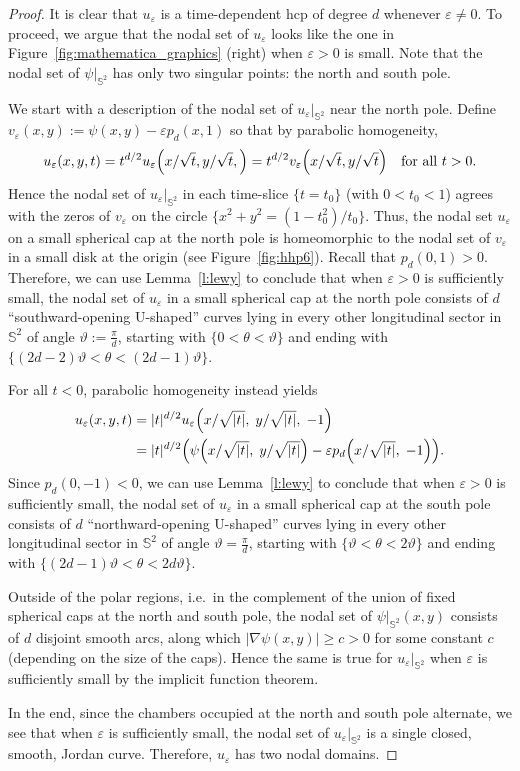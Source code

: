 \documentclass[10pt]{amsart}
\theoremstyle{definition}\newtheorem{defi}[theo]{Definition}\newtheorem{rema}[theo]{Remark}\newtheorem{exam}[theo]{Example}\newtheorem{exem}[theo]{Example}\newtheorem{nota}[theo]{Notation}
\newcommand{\sphere}{\mathbb{S}}
\renewcommand{\epsilon}{\varepsilon}
\let\originalleft\left
\let\originalright\right
\renewcommand{\left}{\mathopen{}\mathclose\bgroup\originalleft}
\renewcommand{\right}{\aftergroup\egroup\originalright}
\begin{document}
\begin{proof}
It is clear that $u_\epsilon$ is a time-dependent hcp of degree $d$ whenever $\epsilon\neq 0$. To proceed, we argue that the nodal set of $u_\epsilon$ looks like the one in Figure~\ref{fig:mathematica_graphics} (right) when $\epsilon>0$ is small. Note that the nodal set of $\psi|_{\sphere^2}$ has only two singular points: the north and south pole.

We start with a description of the nodal set of $u_\epsilon|_{\sphere^2}$ near the north pole. Define $v_\epsilon (x,y):=\psi(x,y)-\epsilon p_d(x,1)$ so that by parabolic homogeneity,
\[
u_\epsilon(x,y,t)= t^{d/2} u_\epsilon\left(x/\sqrt{t},y/\sqrt{t},\right)=t^{d/2}v_\epsilon\left(x/\sqrt{t},y/\sqrt{t}\right)\quad\text{for all $t>0$}.
\]
Hence the nodal set of $u_{\epsilon}|_{\sphere^2}$ in each time-slice $\{t=t_0\}$ (with $0<t_0<1$) agrees with the zeros of $v_{\epsilon}$ on the circle $\{x^2 + y^2 = (1-t_0^2)/t_0 \}$. Thus, the nodal set $u_\epsilon$ on a small spherical cap at the north pole is homeomorphic to the nodal set of $v_\epsilon$ in a small disk at the origin (see Figure~\ref{fig:hhp6}). Recall that $p_d(0,1)>0$. Therefore, we can use Lemma~\ref{l:lewy} to conclude that when $\epsilon>0$ is sufficiently small, the nodal set of $u_\epsilon$ in a small spherical cap at the north pole consists of $d$ ``southward-opening U-shaped'' curves lying in every other longitudinal sector in $\sphere^2$ of angle $\vartheta:=\frac{\pi}{d}$, starting with $\{0 < \theta < \vartheta\}$ and ending with $\{(2d-2)\vartheta<\theta<(2d-1)\vartheta\}$.

For all $t<0$, parabolic homogeneity instead yields
\begin{align*}
u_\epsilon(x,y,t) &=|t|^{d/2}u_\epsilon\left(x/\sqrt{|t|},\;y/\sqrt{|t|},\;-1\right)\\
&=|t|^{d/2}\left(\psi\left(x/\sqrt{|t|},\;y/\sqrt{|t|}\right)-\epsilon p_d\left(x/\sqrt{|t|},\;-1\right)\right).
\end{align*}
Since $p_d(0,-1)<0$, we can use Lemma~\ref{l:lewy} to conclude that when $\epsilon>0$ is sufficiently small, the nodal set of $u_\epsilon$ in a small spherical cap at the south pole consists of $d$ ``northward-opening U-shaped'' curves lying in every other longitudinal sector in $\sphere^2$ of angle $\vartheta=\frac{\pi}{d}$, starting with $\{\vartheta < \theta < 2\vartheta\}$ and ending with $\{(2d-1)\vartheta<\theta<2d\vartheta\}$.

Outside of the polar regions, i.e.~in the complement of the union of fixed spherical caps at the north and south pole, the nodal set of $\psi|_{\sphere^2}(x,y)$ consists of $d$ disjoint smooth arcs, along which $|\nabla \psi(x,y)|\geq c>0$ for some constant $c$ (depending on the size of the caps). Hence the same is true for $u_\epsilon|_{\sphere^2}$ when $\epsilon$ is sufficiently small by the implicit function theorem.

In the end, since the chambers occupied at the north and south pole alternate, we see that when $\epsilon$ is sufficiently small, the nodal set of $u_\epsilon|_{\sphere^2}$ is a single closed, smooth, Jordan curve. Therefore, $u_\epsilon$ has two nodal domains.
\end{proof}
\end{document}
